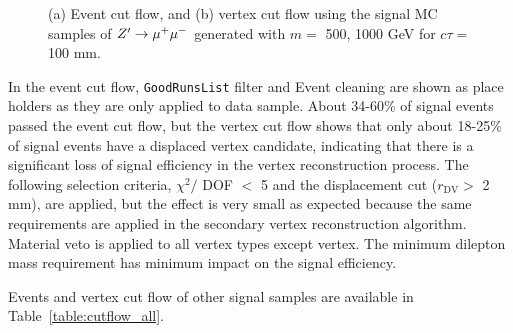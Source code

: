 \begin{figure}[!htb]
    \centering
    \caption{(a) Event cut flow, and (b) vertex cut flow using the signal MC samples of $Z'\rightarrow \mu^{+}\mu^{-}$ generated with $m =$ 500, 1000 GeV for $c\tau= $ 100 mm.}
    \label{fig:signal_cutflow_MC_mumu}
\end{figure}

In the event cut flow, \texttt{GoodRunsList} filter and Event cleaning are shown as place holders as they are only applied to data sample. About 34-60$\%$ of signal events passed the event cut flow, but the vertex cut flow shows that only about 18-25$\%$ of signal events have a displaced vertex candidate, indicating that there is a significant loss of signal efficiency in the vertex reconstruction process. The following selection criteria, $\chi^{2} /$ DOF $<$ 5 and the displacement cut ($r_{\mathrm{DV}} > $ 2 mm), are applied, but the effect is very small as expected because the same requirements are applied in the secondary vertex reconstruction algorithm. Material veto is applied to all vertex types except \mumu vertex. The minimum dilepton mass requirement has minimum impact on the signal efficiency.

Events and vertex cut flow of other signal samples are available in Table~\ref{table:cutflow_all}.


